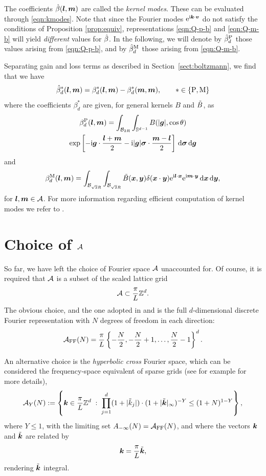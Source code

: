 The coefficients $\hat{\beta}({\bm l},{\bm m})$ are called the {\em kernel modes}. These can be
evaluated through \eqref{eqn:kmodes}.  Note that since the Fourier modes
$\mathrm{e}^{\mathrm{i}{\bm k}\cdot {\bm v}}$ do not satisfy the conditions of Proposition
\ref{prop:equiv}, representations \eqref{eqn:Q-p-b} and \eqref{eqn:Q-m-b} will
yield {\em different} values for $\hat{\beta}$. In the following, we will denote by
$\hat{\beta}_d^{\mathrm{P}}$ those values arising from \eqref{eqn:Q-p-b}, and by $\hat{\beta}_d^{\mathrm{M}}$ those
arising from \eqref{eqn:Q-m-b}. 

Separating gain and loss terms as described in Section~\ref{sect:boltzmann}, we
find that we have 
\[ 
    \hat{\beta}_d^\ast({\bm l},{\bm m}) = \beta_d^\ast({\bm l},{\bm m}) - \beta_d^\ast({\bm m},{\bm m}),\qquad
    \ast \in \{\mathrm{P},\mathrm{M}\}
\]
where the coefficients $\beta_d^\ast$ are given, for general kernels $B$ and $\tilde{B}$, as 
\begin{multline} \label{eqn:B-p} 
    \beta_d^{\mathrm{P}}({\bm l},{\bm m}) = \int_{\mathcal{B}_{2R}}\int_{\mathbb{S}^{d-1}} B(|{\bm g}|,\cos\theta) \\
    \exp\left[ -\mathrm{i}{\bm g}\cdot\frac{{\bm l}+{\bm m}}{2} - 
        \mathrm{i}|{\bm g}|{\bm\sigma}\cdot\frac{{\bm m}-{\bm l}}{2} \right] \,\mathrm{d}{\bm\sigma} \,\mathrm{d} {\bm g}
\end{multline}
and
\begin{equation} \label{eqn:B-m} 
    \beta_d^{\mathrm{M}}({\bm l},{\bm m}) = \int_{\mathcal{B}_{\sqrt{2}R}}\int_{\mathcal{B}_{\sqrt{2}R}} 
        \tilde{B}({\bm x},{\bm y})\delta({\bm x}\cdot {\bm y}) \mathrm{e}^{\mathrm{i}{\bm l}\cdot {\bm x}} 
        \mathrm{e}^{\mathrm{i}{\bm m}\cdot {\bm y}} \,\mathrm{d} {\bm x} \,\mathrm{d} {\bm y},
\end{equation}
for ${\bm l},{\bm m}\in\mathcal{A}$. For more information regarding efficient computation of kernel modes we refer to
\cite{Pareschi00,Mouhot06}.

\section{Choice of $\mathcal{A}$} \label{sec:hyper}

So far, we have left the choice of Fourier space $\mathcal{A}$ unaccounted for. Of
course, it is required that $\mathcal{A}$ is a subset of the scaled lattice grid
\[ 
    \mathcal{A} \subset \frac{\pi}{L}\mathbb{Z}^d. 
\]
The obvious choice, and the one adopted in \cite{Pareschi00} and
\cite{Mouhot06} is the full $d$-dimensional discrete Fourier
representation with $N$ degrees of freedom in each direction:
\[
    \mathcal{A}_\text{FF}(N) = \frac{\pi}{L}\left\{-\frac{N}{2}, -\frac{N}{2}+1, \ldots, 
            \frac{N}{2}-1\right\}^d.
\]

An alternative choice is the {\em hyperbolic cross} Fourier space, which can be
considered the frequency-space equivalent of sparse grids (see for example
\cite{Gradinaru07,Knapek00,Griebel13} for more details),
\[
    \mathcal{A}_Y(N):= \left\{ {\bm k}\in \frac{\pi}{L}\mathbb{Z}^d \;:\; \prod_{j=1}^d(1+|\tilde{k}_j|)
            \cdot (1+|\tilde{{\bm k}}|_\infty)^{-Y} \le (1+N)^{1-Y} \right\},
\]
where $Y\leq1$, with the limiting set $A_{-\infty}(N) = \mathcal{A}_\text{FF}(N)$, and where the
vectors ${\bm k}$ and $\tilde{{\bm k}}$ are related by
\[
    {\bm k} = \frac{\pi}{L}\tilde{{\bm k}},
\]
rendering $\tilde{{\bm k}}$ integral. 

